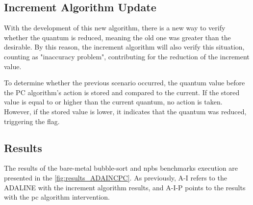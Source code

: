 \subsection{Increment Algorithm Update}

With the development of this new algorithm, there is a new way to verify whether the quantum is reduced, meaning the old one was greater than the desirable. By this reason, the increment algorithm will also verify this situation, counting as "inaccuracy problem", contributing for the reduction of the increment value.

To determine whether the previous scenario occurred, the quantum value before the PC algorithm's action is stored and compared to the current. If the stored value is equal to or higher than the current quantum, no action is taken. However, if the stored value is lower, it indicates that the quantum was reduced, triggering the flag. 


\subsection{Results}

The results of the bare-metal bubble-sort and \glspl{npb} benchmarks execution are presented in the \autoref{fig:results_ADAINCPC}. As previously, A-I refers to the ADALINE with the increment algorithm results, and A-I-P points to the results with the \gls{pc} algorithm intervention. 

